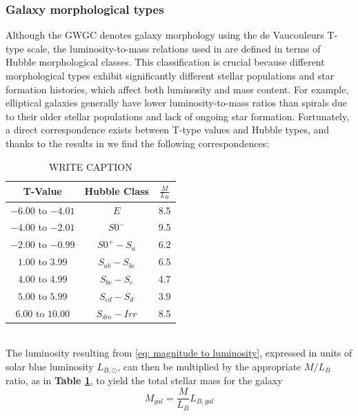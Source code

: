 \subsubsection{Galaxy morphological types}
Although the GWGC denotes galaxy morphology using the de Vaucouleurs T-type scale, the luminosity-to-mass relations used in \cite{Faber&Gallagher} are defined in terms of Hubble morphological classes.
This classification is crucial because different morphological types exhibit significantly different stellar populations and star formation histories, which affect both luminosity and mass content.
For example, elliptical galaxies generally have lower luminosity-to-mass ratios than spirals due to their older stellar populations and lack of ongoing star formation.
Fortunately, a direct correspondence exists between T-type values and Hubble types, and thanks to the results in \cite{Faber&Gallagher} we find the following correspondences:
\begin{table}[h!]
    \centering
    \begin{tabular}{ccc}
        T-Value & Hubble Class & $\frac{M}{L_B}$ \\
        \hline
        $-6.00$ to $-4.01$ & $E$ & 8.5\\
        $-4.00$ to $-2.01$ & $S0^-$ & 9.5\\
        $-2.00$ to $-0.99$ & $S0^+-S_a$ & 6.2\\
        $1.00$ to $3.99$ & $S_{ab}-S_{bc}$ & 6.5\\
        $4.00$ to $4.99$ & $S_{bc}-S_{c}$ & 4.7\\
        $5.00$ to $5.99$ & $S_{cd}-S_{d}$ & 3.9\\
        $6.00$ to $10.00$ & $S_{dm}-Irr$ & 8.5\\
        \hline
    \end{tabular}
    \caption{WRITE CAPTION}
    \label{tab: mass luminosity conversions tab}
\end{table}\\
\vspace{3mm}
The luminosity resulting from \eqref{eq: magnitude to luminosity}, expressed in units of solar blue luminosity $L_{B,\odot}$, can then be multiplied by the appropriate $M/L_B$ ratio, as in \textbf{Table \ref{tab: mass luminosity conversions tab}}, to yield the total stellar mass for the galaxy
\begin{equation}
    M_{gal} = \frac{M}{L_B}L_{B,gal}
    \label{eq: total mass calculation}
\end{equation}


